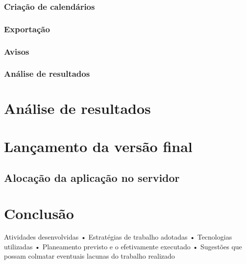 \documentclass[12pt, twoside]{report}
\begin{document}
	\subsection{Criação de calendários}
	
	
	\subsection{Exportação}
	\subsection{Avisos}
	\subsection{Análise de resultados}
	
	
	
	\chapter{Análise de resultados}
	
	
	
	
	\chapter{Lançamento da versão final}
	
	\section{Alocação da aplicação no servidor}
	
	
	
	\chapter{Conclusão}
	
	Atividades desenvolvidas
	• Estratégias de trabalho adotadas
	• Tecnologias utilizadas
	• Planeamento previsto e o efetivamente executado
	• Sugestões que possam colmatar eventuais lacunas do
	trabalho realizado
	
	
	
	\pagestyle{empty}
	
	
\end{document}
